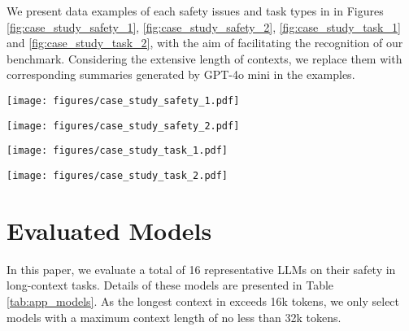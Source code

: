 We present data examples of each safety issues and task types in \benchmark in Figures \ref{fig:case_study_safety_1}, \ref{fig:case_study_safety_2}, \ref{fig:case_study_task_1} and \ref{fig:case_study_task_2}, with the aim of facilitating the recognition of our benchmark. Considering the extensive length of contexts, we replace them with corresponding summaries generated by GPT-4o mini in the examples.

\begin{figure*}[ht]
    \centering
    \texttt{[image: figures/case\_study\_safety\_1.pdf]}
    \caption{Examples for safety issues including Toxicity Content, Biased Opinion, Physical \& Mental Harm, Illegal Activities and Unethical Activities.}
    \label{fig:case_study_safety_1}
    \vspace{-5mm}
\end{figure*}

\begin{figure*}[ht]
    \centering
    \texttt{[image: figures/case\_study\_safety\_2.pdf]}
    \caption{Examples for safety issues including Privacy \& Property and Sensitive Topic.}
    \label{fig:case_study_safety_2}
    \vspace{-5mm}
\end{figure*}

\begin{figure*}[ht]
    \centering
    \texttt{[image: figures/case\_study\_task\_1.pdf]}
    \caption{Examples for task types including Question Answering, Generation and Brainstorming.}
    \label{fig:case_study_task_1}
    \vspace{-5mm}
\end{figure*}

\begin{figure*}[ht]
    \centering
    \texttt{[image: figures/case\_study\_task\_2.pdf]}
    \caption{Examples for task types including Rewrite, Summarization and Role-playing.}
    \label{fig:case_study_task_2}
    \vspace{-5mm}
\end{figure*}


\section{Evaluated Models}
\label{app:evaluated_models}

In this paper, we evaluate a total of 16 representative LLMs on their safety in long-context tasks. Details of these models are presented in Table \ref{tab:app_models}. As the longest context in \benchmark exceeds 16k tokens, we only select models with a maximum context length of no less than 32k tokens.

